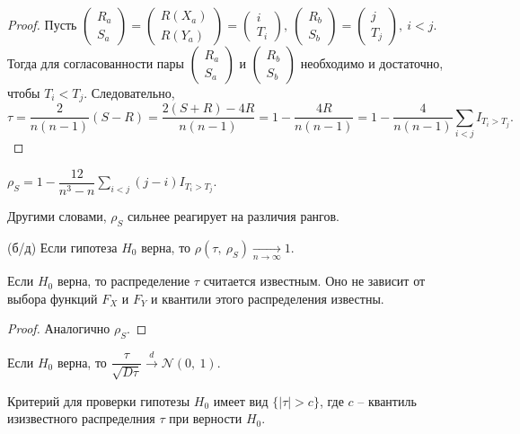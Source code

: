 \begin{proof}
    Пусть $\displaystyle \begin{pmatrix}
    R_{a}\\
    S_{a}
    \end{pmatrix} =\begin{pmatrix}
    R( X_{a})\\
    R( Y_{a})
    \end{pmatrix} =\begin{pmatrix}
    i\\
    T_{i}
    \end{pmatrix} ,\ \begin{pmatrix}
    R_{b}\\
    S_{b}
    \end{pmatrix} =\begin{pmatrix}
    j\\
    T_{j}
    \end{pmatrix} ,\ i< j$. Тогда для согласованности пары $\displaystyle \begin{pmatrix}
    R_{a}\\
    S_{a}
    \end{pmatrix}$ и $\displaystyle \begin{pmatrix}
    R_{b}\\
    S_{b}
    \end{pmatrix}$ необходимо и достаточно, чтобы $\displaystyle T_{i} < T_{j}$. Следовательно,
    \begin{equation*}
        \tau =\dfrac{2}{n( n-1)}( S-R) =\dfrac{2( S+R) -4R}{n( n-1)} =1-\dfrac{4R}{n( n-1)} =1-\dfrac{4}{n( n-1)}\sum _{i< j} I_{T_{i}  >T_{j}} .
    \end{equation*}
\end{proof}
\begin{exercise}
    $\displaystyle \rho _{S} =1-\dfrac{12}{n^{3} -n}\sum _{i< j}( j-i) I_{T_{i}  >T_{j}}$.
\end{exercise}
\begin{note}
    Другими словами, $\displaystyle \rho _{S}$ сильнее реагирует на различия рангов.
\end{note}
\begin{proposition}
    (б/д) Если гипотеза $\displaystyle H_{0}$ верна, то $\displaystyle \rho ( \tau ,\ \rho _{S})\xrightarrow[n\rightarrow \infty ]{} 1$.
\end{proposition}
\begin{proposition}
    Если $\displaystyle H_{0}$ верна, то распределение $\displaystyle \tau $ считается известным. Оно не зависит от выбора функций $\displaystyle F_{X}$ и $\displaystyle F_{Y}$ и квантили этого распределения известны.
\end{proposition}
\begin{proof}
    Аналогично $\displaystyle \rho _{S}$.
\end{proof}
\begin{proposition}
    Если $\displaystyle H_{0}$ верна, то $\displaystyle \dfrac{\tau }{\sqrt{D\tau }}\xrightarrow{d}\mathcal{N}( 0,\ 1)$.
\end{proposition}
Критерий для проверки гипотезы $\displaystyle H_{0}$ имеет вид $\displaystyle \{| \tau |  >c\}$, где $\displaystyle c$ -- квантиль изизвестного распределния $\displaystyle \tau $ при верности $H_0$.